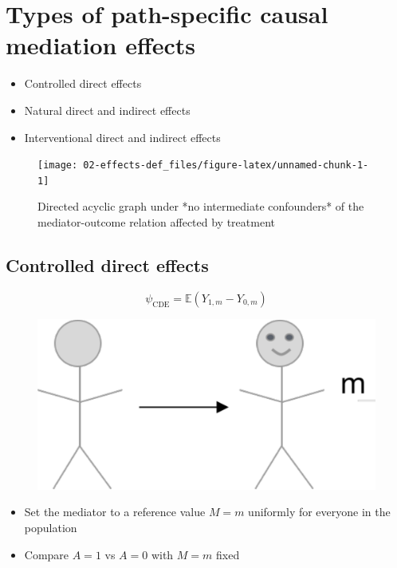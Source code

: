 \documentclass[
  12pt,
]{book}
\providecommand{\tightlist}{%
  \setlength{\itemsep}{0pt}\setlength{\parskip}{0pt}}
\theoremstyle{definition}
\theoremstyle{definition}
\theoremstyle{definition}
\newcommand{\E}{\mathbb{E}}
\newcommand{\1}{\mathbbm{1}}
\begin{document}
\hypertarget{estimands}{%
\chapter{Types of path-specific causal mediation effects}\label{estimands}}

\begin{itemize}
\tightlist
\item
  Controlled direct effects
\item
  Natural direct and indirect effects
\item
  Interventional direct and indirect effects
\end{itemize}

\begin{figure}

{\centering \texttt{[image: 02-effects-def\_files/figure-latex/unnamed-chunk-1-1]} 

}

\caption{Directed acyclic graph under *no intermediate confounders* of the mediator-outcome relation affected by treatment}\label{fig:unnamed-chunk-1}
\end{figure}

\hypertarget{controlled-direct-effects}{%
\section{Controlled direct effects}\label{controlled-direct-effects}}

\[\psi_{\text{CDE}} = \E(Y_{1,m} - Y_{0,m})\]

\begin{figure}

{\centering \includegraphics[width=0.5\linewidth]{img/graphic4a3} 

}

\end{figure}

\begin{itemize}
\tightlist
\item
  Set the mediator to a reference value \(M=m\) uniformly for everyone in the
  population
\item
  Compare \(A=1\) vs \(A=0\) with \(M=m\) fixed
\end{itemize}
\end{document}
